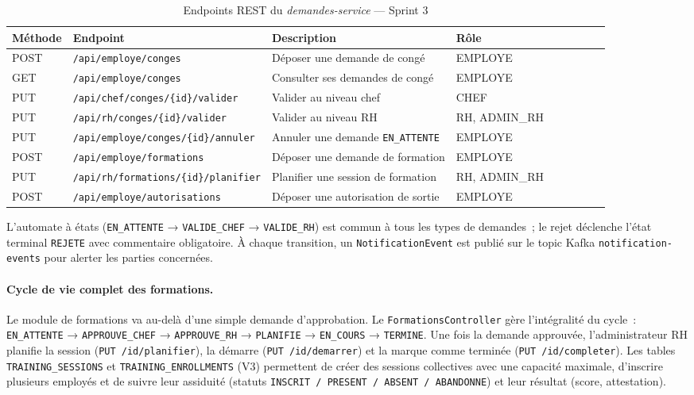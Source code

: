 \begin{table}[H]
\centering
\caption{Endpoints REST du \textit{demandes-service} — Sprint 3}
\label{tab:api_demandes_s3}
\begin{tabularx}{\textwidth}{VlVlVLVlV}
\hline
\textbf{Méthode} & \textbf{Endpoint} & \textbf{Description} & \textbf{Rôle} \\
\hline
POST & \texttt{/api/employe/conges} & Déposer une demande de congé & EMPLOYE \\
\hline
GET & \texttt{/api/employe/conges} & Consulter ses demandes de congé & EMPLOYE \\
\hline
PUT & \texttt{/api/chef/conges/\{id\}/valider} & Valider au niveau chef & CHEF \\
\hline
PUT & \texttt{/api/rh/conges/\{id\}/valider} & Valider au niveau RH & RH, ADMIN\_RH \\
\hline
PUT & \texttt{/api/employe/conges/\{id\}/annuler} & Annuler une demande \texttt{EN\_ATTENTE} & EMPLOYE \\
\hline
POST & \texttt{/api/employe/formations} & Déposer une demande de formation & EMPLOYE \\
\hline
PUT & \texttt{/api/rh/formations/\{id\}/planifier} & Planifier une session de formation & RH, ADMIN\_RH \\
\hline
POST & \texttt{/api/employe/autorisations} & Déposer une autorisation de sortie & EMPLOYE \\
\hline
\end{tabularx}
\end{table}

L'automate à états (\texttt{EN\_ATTENTE} → \texttt{VALIDE\_CHEF} → \texttt{VALIDE\_RH})
est commun à tous les types de demandes~; le rejet déclenche l'état terminal
\texttt{REJETE} avec commentaire obligatoire. À chaque transition, un
\texttt{NotificationEvent} est publié sur le topic Kafka \texttt{notification-events}
pour alerter les parties concernées.

\paragraph{Cycle de vie complet des formations.}
Le module de formations va au-delà d'une simple demande d'approbation. Le
\texttt{FormationsController} gère l'intégralité du cycle~:
\texttt{EN\_ATTENTE} → \texttt{APPROUVE\_CHEF} → \texttt{APPROUVE\_RH} →
\texttt{PLANIFIE} → \texttt{EN\_COURS} → \texttt{TERMINE}. Une fois la demande
approuvée, l'administrateur RH planifie la session (\texttt{PUT /{id}/planifier}),
la démarre (\texttt{PUT /{id}/demarrer}) et la marque comme terminée
(\texttt{PUT /{id}/completer}). Les tables \texttt{TRAINING\_SESSIONS} et
\texttt{TRAINING\_ENROLLMENTS} (V3) permettent de créer des sessions collectives
avec une capacité maximale, d'inscrire plusieurs employés et de suivre leur
assiduité (statuts \texttt{INSCRIT / PRESENT / ABSENT / ABANDONNE}) et leur
résultat (score, attestation).

